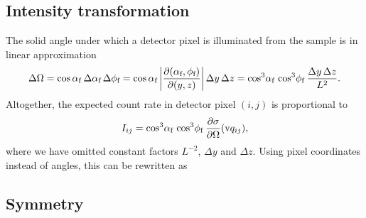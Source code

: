 
\subsection{Intensity transformation}

The solid angle under which a detector pixel
is illuminated from the sample is in linear approximation
\begin{equation}
  \Delta\Omega
  = \cos\alpha_{\text{f}}\:\Delta\alpha_{\text{f}}\,\Delta\phi_{\text{f}}
  = \cos\alpha_{\text{f}}
    \left|\frac{\partial(\alpha_{\text{f}},\phi_{\text{f}})}{\partial(y,z)}\right|
    \Delta y \,\Delta z
  = \cos^3\!\alpha_{\text{f}}\, \cos^3\!\phi_{\text{f}}\: \frac{\Delta y \,\Delta z}{L^2}.
\end{equation}
%
%
Altogether,
the expected count rate in detector pixel $(i,j)$ is proportional to
\begin{equation}\label{EItrafo_cos}
  I_{ij} = \cos^3\!\alpha_{\text{f}}\, \cos^3\!\phi_{\text{f}}\:
          \frac{\partial\sigma}{\partial\Omega}(\text{v}{q}_{ij}),
\end{equation}
where we have omitted constant factors $L^{-2}$, $\Delta y$ and $\Delta z$.
Using pixel coordinates instead of angles, this can be rewritten as


\subsection{Symmetry}


%
